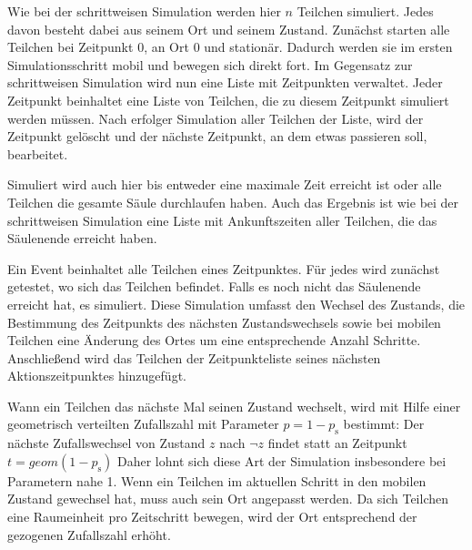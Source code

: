 Wie bei der schrittweisen Simulation werden hier $n$ Teilchen simuliert. Jedes davon besteht dabei aus seinem Ort und seinem Zustand. 
Zunächst starten alle Teilchen bei Zeitpunkt $0$, an Ort $0$ und stationär. Dadurch werden sie im ersten Simulationsschritt mobil und bewegen sich direkt fort. 
Im Gegensatz zur schrittweisen Simulation wird nun eine Liste mit Zeitpunkten verwaltet. Jeder Zeitpunkt beinhaltet eine Liste von Teilchen, die zu diesem Zeitpunkt simuliert werden müssen. Nach erfolger Simulation aller Teilchen der Liste, wird der Zeitpunkt gelöscht und der nächste Zeitpunkt, an dem etwas passieren soll, bearbeitet.

Simuliert wird auch hier bis entweder eine maximale Zeit erreicht ist oder alle Teilchen die gesamte Säule durchlaufen haben. Auch das Ergebnis ist wie bei der schrittweisen Simulation eine Liste mit Ankunftszeiten aller Teilchen, die das Säulenende erreicht haben.


Ein Event beinhaltet alle Teilchen eines Zeitpunktes. Für jedes wird zunächst getestet, wo sich das Teilchen befindet. Falls es noch nicht das Säulenende erreicht hat, es simuliert. Diese Simulation umfasst den Wechsel des Zustands, die Bestimmung des Zeitpunkts des nächsten Zustandswechsels sowie bei mobilen Teilchen eine Änderung des Ortes um eine entsprechende Anzahl Schritte. Anschließend wird das Teilchen der Zeitpunkteliste seines nächsten Aktionszeitpunktes hinzugefügt.

Wann ein Teilchen das nächste Mal seinen Zustand wechselt, wird mit Hilfe einer geometrisch verteilten Zufallszahl mit Parameter $p=1-p_\text{s}$ bestimmt: Der nächste Zufallswechsel von Zustand $z$ nach $\neg z$ findet statt an Zeitpunkt $t= geom(1-p_{\text{s}})$ %
Daher lohnt sich diese Art der Simulation insbesondere bei Parametern nahe 1. 
Wenn ein Teilchen im aktuellen Schritt in den mobilen Zustand gewechsel hat, muss auch sein Ort angepasst werden. Da sich Teilchen eine Raumeinheit pro Zeitschritt bewegen, wird der Ort entsprechend der gezogenen Zufallszahl erhöht.

